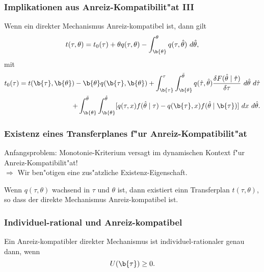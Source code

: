 \begin{frame}
  \frametitle{Implikationen aus Anreiz-Kompatibilit"at III}
  \justifying
  \begin{thmP}
    Wenn ein direkter Mechanismus Anreiz-kompatibel ist, dann gilt
    \begin{equation*}
      t(\tau, \theta) = t_{0}(\tau) + \theta q(\tau, \theta) - \int_{\b{\theta}}^{\theta} q(\tau, \hat{\theta}) \ d \hat{\theta},
    \end{equation*}
    mit
    \begin{align*}
      t_{0}(\tau) = t(\b{\tau},\b{\theta}) - \b{\theta} q(\b{\tau}, \b{\theta})
      + \int_{\b{\tau}}^{\tau} \int_{\b{\theta}}^{\bar{\theta}} q(\hat{\tau}, \hat{\theta}) \dfrac{\delta F(\hat{\theta} \mid \hat{\tau})}{\delta \tau} \ d \hat{\theta} \ d \hat{\tau} \\
      + \int_{\b{\theta}}^{\bar{\theta}} \int_{\b{\theta}}^{\hat{\theta}} [q(\tau, x) f(\hat{\theta} \mid \tau) - q(\b{\tau}, x) f(\hat{\theta} \mid \b{\tau})] \ d x \ d \hat{\theta}.
    \end{align*}
  \end{thmP}
\end{frame}

\begin{frame}
  \frametitle{Existenz eines Transferplanes f"ur Anreiz-Kompatibilit"at}
  \justifying
  Anfangsproblem: Monotonie-Kriterium versagt im dynamischen Kontext f"ur Anreiz-Kompatibilit"at! \\
  $\Rightarrow$ Wir ben"otigen eine zus"atzliche Existenz-Eigenschaft.
  \begin{thmP}
    Wenn $q(\tau, \theta)$ wachsend in $\tau$ und $\theta$ ist, dann existiert einn Transferplan $t(\tau, \theta)$, so dass der direkte Mechanismus
    Anreiz-kompatibel ist.
  \end{thmP}
\end{frame}

\begin{frame}
  \frametitle{Individuel-rational und Anreiz-kompatibel}
  \justifying
  \begin{thmP}
    Ein Anreiz-kompatibler direkter Mechanismus ist individuel-rationaler genau dann, wenn
    \begin{equation*}
      U(\b{\tau}) \ge 0.
    \end{equation*}
  \end{thmP}
\end{frame}

